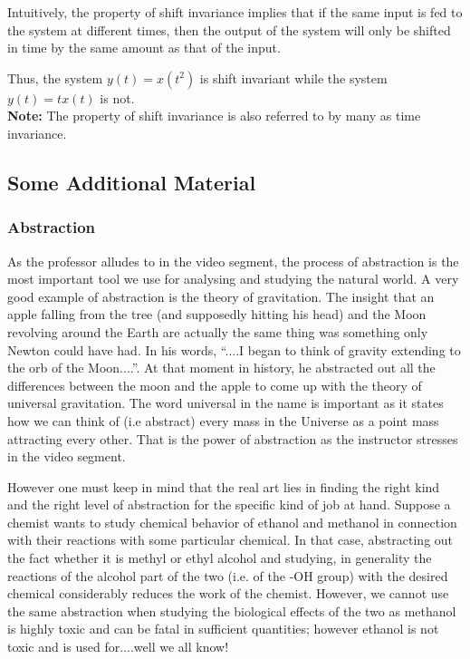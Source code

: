 Intuitively, the property of shift invariance implies that if the same input is fed to the system at different times, then the output of the system will only be shifted in time by the same amount 
as that of the input.

Thus, the system $y(t) = x(t^{2})$ is shift invariant while the system $y(t) = tx(t)$ is not.\\
\textbf{Note:} The property of shift invariance is also referred to by many as time invariance.

\subsection*{Some Additional Material}
\subsubsection{Abstraction}
As the professor alludes to in the video segment, the process of abstraction is the most important tool we use for analysing and studying the natural world. A very good example of abstraction is the theory of gravitation. The insight that an apple falling from the tree (and supposedly hitting his head) and the Moon revolving around the Earth are actually the same thing was something only Newton could have had. In his words, ``....I began to think of gravity extending to the orb of the Moon....''. At that moment in history, he abstracted out all the differences between the moon and the apple to come up with the theory of universal gravitation. The word universal in the name is important as it states how we can think of (i.e abstract) every mass in the Universe as a point mass attracting every other. That is the power of abstraction as the instructor stresses in the video segment.

However one must keep in mind that the real art lies in finding the right kind and the right level of abstraction for the specific kind of job at hand. Suppose a chemist wants to study chemical behavior of ethanol and methanol in connection with their reactions with some particular chemical. In that case, abstracting out the fact whether it is methyl or ethyl alcohol and studying, in generality the reactions of the alcohol part of the two (i.e. of the -OH group) with the desired chemical considerably reduces the work of the chemist. However, we cannot use the same abstraction when studying the biological effects of the two as methanol is highly toxic and can be fatal in sufficient quantities; however ethanol is not toxic and is used for....well we all know!